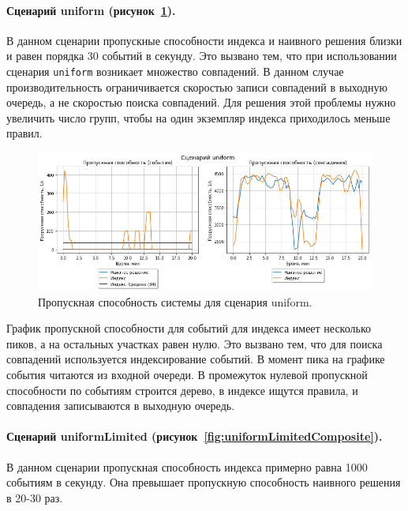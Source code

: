 \documentclass[14pt]{article}
\begin{document}
\paragraph{Сценарий uniform (рисунок~\ref{fig:uniformComposite}).} В данном сценарии пропускные способности индекса и наивного решения близки и равен порядка 30 событий в секунду. Это вызвано тем, что при использовании сценария \verb|uniform| возникает множество совпадений. В данном случае производительность ограничивается скоростью записи совпадений в выходную очередь, а не скоростью поиска совпадений. Для решения этой проблемы нужно увеличить число групп, чтобы на один экземпляр индекса приходилось меньше правил. 

\begin{figure}[h!]
    \centering
    \includegraphics[width=1\textwidth]{images/composite/uniformComposite.png}
    \caption{Пропускная способность системы для сценария uniform.}
    \label{fig:uniformComposite}
\end{figure}

График пропускной способности для событий для индекса имеет несколько пиков, а на остальных участках равен нулю. Это вызвано тем, что для поиска совпадений используется индексирование событий. В момент пика на графике события читаются из входной очереди. В промежуток нулевой пропускной способности по событиям строится дерево, в индексе ищутся правила, и совпадения записываются в выходную очередь.


\paragraph{Сценарий uniformLimited (рисунок~\ref{fig:uniformLimitedComposite}).} В данном сценарии пропускная способность индекса примерно равна 1000 событиям в секунду. Она превышает пропускную способность наивного решения в 20-30 раз.
\end{document}

